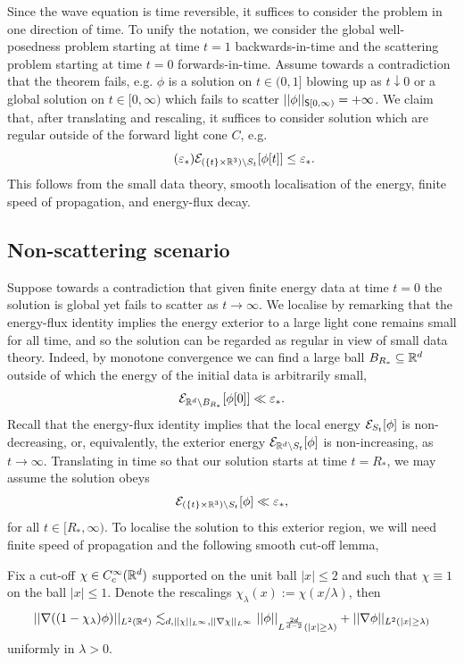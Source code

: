 Since the wave equation is time reversible, it suffices to consider the problem in one direction of time. To unify the notation, we consider the global well-posedness problem starting at time $t = 1$ backwards-in-time and the scattering problem starting at time $t = 0$ forwards-in-time. Assume towards a contradiction that the theorem fails, e.g. $\phi$ is a solution on $t \in (0, 1]$ blowing up as $t \downarrow 0$ or a global solution on $t \in[0, \infty)$ which fails to scatter $||\phi||_{\mathsf S[0, \infty)} = +\infty$. We claim that, after translating and rescaling, it suffices to consider solution which are regular outside of the forward light cone $C$, e.g.
	\begin{equation}\tag{$\epsilon_*$}\label{eq:exterior}
		\cE_{(\{t\} \times \R^3) \setminus S_t} [\phi[t]] \leq \epsilon_*.
	\end{equation}
This follows from the small data theory, smooth localisation of the energy, finite speed of propagation, and energy-flux decay. 

\subsection{Non-scattering scenario}

Suppose towards a contradiction that given finite energy data at time $t = 0$ the solution is global yet fails to scatter as $t \to \infty$. We localise by remarking that the energy-flux identity implies the energy exterior to a large light cone remains small for all time, and so the solution can be regarded as regular in view of small data theory. Indeed, by monotone convergence we can find a large ball $B_{R_*} \subseteq \mathbb R^d$ outside of which the energy of the initial data is arbitrarily small, 
	\[
		\mathcal E_{\mathbb R^d \setminus B_{R_*}}[\phi[0]] \ll \varepsilon_*. 
	\]
Recall that the energy-flux identity implies that the local energy $\mathcal E_{S_t} [\phi]$ is non-decreasing, or, equivalently, the exterior energy $\mathcal E_{\mathbb R^d \setminus S_t} [\phi]$ is non-increasing, as $t \to \infty$. Translating in time so that our solution starts at time $t = R_*$, we may assume the solution obeys
	\[
		\mathcal E_{(\{t\} \times \mathbb R^3) \setminus S_t} [\phi] \ll \varepsilon_*,
	\]
for all $t \in [R_*, \infty)$. To localise the solution to this exterior region, we will need finite speed of propagation and the following smooth cut-off lemma, 

\begin{lemma}\label{lem:ext}
	Fix a cut-off $\chi \in C^\infty_c (\mathbb R^d)$ supported on the unit ball $|x| \leq 2$ and such that $\chi \equiv 1$ on the ball $|x| \leq 1$. Denote the rescalings $\chi_\lambda (x) := \chi(x/\lambda)$, then 
		\[
			||\nabla ((1 - \chi_\lambda) \phi)||_{L^2 (\mathbb R^d)}
				\lesssim_{d, ||\chi||_{L^\infty}, ||\nabla \chi||_{L^\infty}} ||\phi||_{L^{\frac{2d}{d - 2}} (|x| \geq  \lambda)} + ||\nabla \phi||_{L^2 (|x| \geq  \lambda)}
		\]
	uniformly in $\lambda > 0$. 	
\end{lemma}

